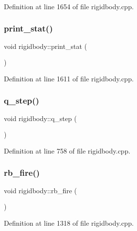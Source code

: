 Definition at line 1654 of file rigidbody.\+cpp.

\mbox{\label{classrigidbody_aa00fc3768317e6852643a37cbe19c76a}} 
\subsubsection{\texorpdfstring{print\+\_\+stat()}{print\_stat()}}
{\footnotesize\ttfamily void rigidbody\+::print\+\_\+stat (\begin{DoxyParamCaption}{ }\end{DoxyParamCaption})}



Definition at line 1611 of file rigidbody.\+cpp.

\mbox{\label{classrigidbody_a4367ebfbba9658e93277b388c346ef6d}} 
\subsubsection{\texorpdfstring{q\+\_\+step()}{q\_step()}}
{\footnotesize\ttfamily void rigidbody\+::q\+\_\+step (\begin{DoxyParamCaption}{ }\end{DoxyParamCaption})}



Definition at line 758 of file rigidbody.\+cpp.

\mbox{\label{classrigidbody_a11a83ecf91f922faff8e2f26c8eace54}} 
\subsubsection{\texorpdfstring{rb\+\_\+fire()}{rb\_fire()}}
{\footnotesize\ttfamily void rigidbody\+::rb\+\_\+fire (\begin{DoxyParamCaption}{ }\end{DoxyParamCaption})}



Definition at line 1318 of file rigidbody.\+cpp.

\mbox{\label{classrigidbody_ab2d23acd630aa36261f68b7c01ce3dd4}} 
